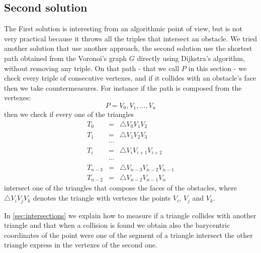 \documentclass[dissertation.tex]{subfiles}
\begin{document}
\subsection{Second solution}\label{sec:inter2}
The First solution is interesting from an algorithmic point of view,
but is not very practical because it throws all the triples that
intersect an obstacle. We tried another
solution that use another approach, the second solution use the
shortest path obtained
from the Voronoi's graph $G$ directly using Dijkstra's algorithm,
without removing any triple. On that path
- that we call $P$ in this section - we
check every triple of consecutive vertexes, and if it collides with an
obstacle's face then we take countermeasures. For instance if the path
is composed from the vertexes:
\begin{equation*}
  P=V_0,V_1,\dots,V_n
\end{equation*}
then we check if every one of the triangles 
\begin{eqnarray*}
T_0 &=& \triangle V_0V_1V_2\\
T_1 &=& \triangle V_1V_2V_3\\
&\cdots&\\
T_i &=& \triangle V_iV_{i+1}V_{i+2}\\
&\cdots&\\
T_{n-3} &=& \triangle V_{n-3}V_{n-2}V_{n-1}\\
T_{n-2} &=& \triangle V_{n-2}V_{n-1}V_n
\end{eqnarray*}
intersect one of the triangles that compose the faces of the
obstacles, where $\triangle V_iV_jV_k$ denotes the triangle with
vertexes the points $V_i$, $V_j$ and $V_k$.

In \cref{sec:intersections} we explain how to measure if a triangle
collides with another triangle and that when a collision is found we
obtain also the barycentric coordinates of the point were one of the
segment of a triangle intersect the other triangle express in the
vertexes of the second one.
\end{document}
